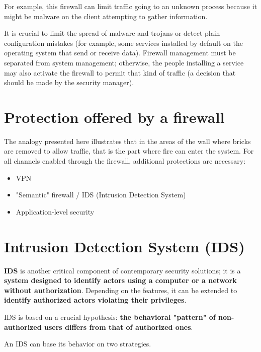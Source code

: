 For example, this firewall can limit traffic going to an unknown process because it might be malware on the client attempting to gather information.

It is crucial to limit the spread of malware and trojans or detect plain configuration mistakes (for example, some services installed by default on the operating system that send or receive data). Firewall management must be separated from system management; otherwise, the people installing a service may also activate the firewall to permit that kind of traffic (a decision that should be made by the security manager).



\section{Protection offered by a firewall}

The analogy presented here illustrates that in the areas of the wall where bricks are removed to allow traffic, that is the part where fire can enter the system. For all channels enabled through the firewall, additional protections are necessary:

\begin{itemize}
    \item VPN
    \item "Semantic" firewall / IDS (Intrusion Detection System)
    \item Application-level security
\end{itemize}


\section{Intrusion Detection System (IDS)}

\textbf{IDS} is another critical component of contemporary security solutions; it is a \textbf{system designed to identify actors using a computer or a network without authorization}.
Depending on the features, it can be extended to \textbf{identify authorized actors violating their privileges}.

IDS is based on a crucial hypothesis: \textbf{the behavioral "pattern" of non-authorized users differs from that of authorized ones}.

An IDS can base its behavior on two strategies.

